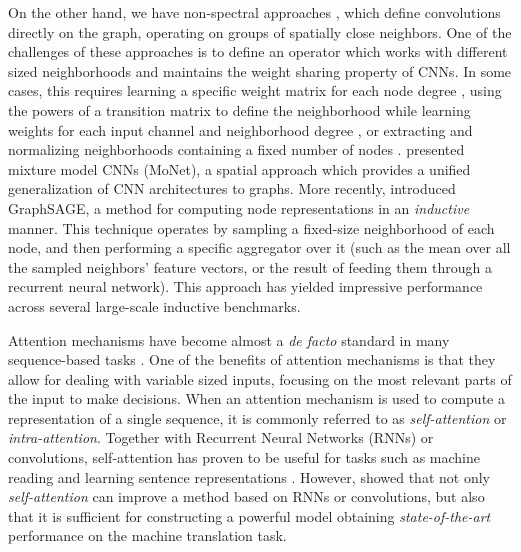 \documentclass{article} \usepackage{iclr2018_conference,times}
\begin{document}
On the other hand, we have non-spectral approaches \citep{duvenaud2015convolutional, atwood2016diffusion, hamilton2017inductive}, which define convolutions directly on the graph, operating on groups of spatially close neighbors. One of the challenges of these approaches is to define an operator which works with different sized neighborhoods and maintains the weight sharing property of CNNs. In some cases, this requires learning a specific weight matrix for each node degree \citep{duvenaud2015convolutional}, using the powers of a transition matrix to define the neighborhood while learning weights for each input channel and neighborhood degree \citep{atwood2016diffusion}, or extracting and normalizing neighborhoods containing a fixed number of nodes \citep{niepert16}. \cite{monti2016geometric} presented mixture model CNNs (MoNet), a spatial approach which provides a unified generalization of CNN architectures to graphs. More recently, \cite{hamilton2017inductive} introduced GraphSAGE, a method for computing node representations in an \textit{inductive} manner. This technique operates by sampling a fixed-size neighborhood of each node, and then performing a specific aggregator over it (such as the mean over all the sampled neighbors' feature vectors, or the result of feeding them through a recurrent neural network). This approach has yielded impressive performance across several large-scale inductive benchmarks.

Attention mechanisms have become almost a \emph{de facto} standard in many sequence-based tasks \citep{bahdanau2014neural,GehringAGD16}. One of the benefits of attention mechanisms is that they allow for dealing with variable sized inputs, focusing on the most relevant parts of the input to make decisions. When an attention mechanism is used to compute a representation of a single sequence, it is commonly referred to as \emph{self-attention} or \emph{intra-attention}. Together with Recurrent Neural Networks (RNNs) or convolutions, self-attention has proven to be useful for tasks such as machine reading \citep{cheng2016long} and learning sentence representations \citep{lin2017structured}. However, \cite{vaswani2017attention} showed that not only \emph{self-attention} can improve a method based on RNNs or convolutions, but also that it is sufficient for constructing a powerful model obtaining \emph{state-of-the-art} performance on the machine translation task. 
\end{document}

